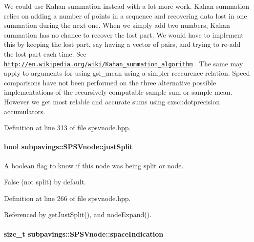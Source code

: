 \-We could use \-Kahan summation instead with a lot more work. \-Kahan summation relies on adding a number of points in a sequence and recovering data lost in one summation during the next one. \-When we simply add two numbers, \-Kahan summation has no chance to recover the lost part. \-We would have to implement this by keeping the lost part, say having a vector of pairs, and trying to re-\/add the lost part each time. \-See \href{http://en.wikipedia.org/wiki/Kahan_summation_algorithm}{\tt http\-://en.\-wikipedia.\-org/wiki/\-Kahan\-\_\-summation\-\_\-algorithm} . \-The same may apply to arguments for using gsl\-\_\-mean using a simpler reccurence relation. \-Speed comparisons have not been performed on the three alternative possible implementations of the recursively computable sample sum or sample mean. \-However we get most relable and accurate sums using cxsc\-::dotprecision accumulators. 

\-Definition at line 313 of file spsvnode.\-hpp.

\hypertarget{classsubpavings_1_1SPSVnode_a288af7a8149effcb2d19e163e217e951}{
\paragraph[{just\-Split}]{\setlength{\rightskip}{0pt plus 5cm}bool {\bf subpavings\-::\-S\-P\-S\-Vnode\-::just\-Split}}}\label{classsubpavings_1_1SPSVnode_a288af7a8149effcb2d19e163e217e951}


\-A boolean flag to know if this node was being split or node. 

\-False (not split) by default. 

\-Definition at line 266 of file spsvnode.\-hpp.



\-Referenced by get\-Just\-Split(), and node\-Expand().

\hypertarget{classsubpavings_1_1SPSVnode_a98a73d1c8dafe1d9248aeec76c8f74ef}{
\paragraph[{space\-Indication}]{\setlength{\rightskip}{0pt plus 5cm}size\-\_\-t {\bf subpavings\-::\-S\-P\-S\-Vnode\-::space\-Indication}}}\label{classsubpavings_1_1SPSVnode_a98a73d1c8dafe1d9248aeec76c8f74ef}


